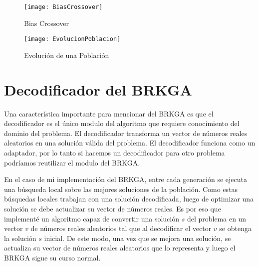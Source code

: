 \begin{figure}[h]
	\caption{Bias Crossover}
	\centering
	\texttt{[image: BiasCrossover]}
	\label{fig:biasCrossover}
\end{figure}

\begin{figure}[h]
	\caption{Evolución de una Población}
	\centering
	\texttt{[image: EvolucionPoblacion]}
	\label{fig:evolucion}
\end{figure}

\section{Decodificador del BRKGA}

Una característica importante para mencionar del BRKGA es que el decodificador es el único modulo del algoritmo que requiere conocimiento del dominio del problema. El decodificador transforma un vector de números reales aleatorios en una solución válida del problema. El decodificador funciona como un adaptador, por lo tanto si hacemos un decodificador para otro problema podríamos reutilizar el modulo del BRKGA.

\bigskip

En el caso de mi implementación del BRKGA, entre cada generación se ejecuta una búsqueda local sobre las mejores soluciones de la población. Como estas búsquedas locales trabajan con una solución decodificada, luego de optimizar una solución se debe actualizar su vector de números reales. Es por eso que implementé un algoritmo capaz de convertir una solución $s$ del problema en un vector $v$ de números reales aleatorios tal que al decodificar el vector $v$ se obtenga la solución $s$ inicial. De este modo, una vez que se mejora una solución, se actualiza su vector de números reales aleatorios que lo representa y luego el BRKGA sigue su curso normal. 

